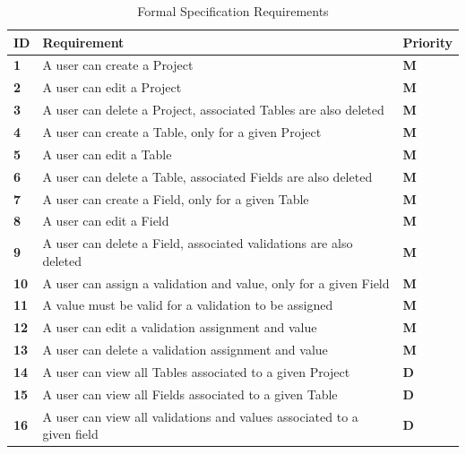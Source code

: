 \documentclass[a4paper,12pt]{article}
\begin{document}
\begin{table}
\centering
\caption{Formal Specification Requirements}
\label{my-label}
\begin{tabular}{|l|l|l|}
\hline
\textbf{ID} & \textbf{Requirement}                                                   & \textbf{Priority} \\ \hline
\textbf{1}  & A user can create a Project                                            & \textbf{M}        \\ \hline
\textbf{2}  & A user can edit a Project                                              & \textbf{M}        \\ \hline
\textbf{3}  & A user can delete a Project, associated Tables are also deleted        & \textbf{M}        \\ \hline
\textbf{4}  & A user can create a Table, only for a given  Project                   & \textbf{M}        \\ \hline
\textbf{5}  & A user can edit a Table                                                & \textbf{M}        \\ \hline
\textbf{6}  & A user can delete a Table, associated Fields are also deleted          & \textbf{M}        \\ \hline
\textbf{7}  & A user can create a Field, only for a given Table                      & \textbf{M}        \\ \hline
\textbf{8}  & A user can edit a Field                                                & \textbf{M}        \\ \hline
\textbf{9}  & A user can delete a Field, associated validations are also deleted     & \textbf{M}        \\ \hline
\textbf{10} & A user can assign a validation and value, only for a given Field       & \textbf{M}        \\ \hline
\textbf{11} & A value must be valid for a validation to be assigned                  & \textbf{M}        \\ \hline
\textbf{12} & A user can edit a validation assignment and value                      & \textbf{M}        \\ \hline
\textbf{13} & A user can delete a validation assignment and value                    & \textbf{M}        \\ \hline
\textbf{14} & A user can view all Tables associated to a given Project               & \textbf{D}        \\ \hline
\textbf{15} & A user can view all Fields associated to a given Table                 & \textbf{D}        \\ \hline
\textbf{16} & A user can view all validations and values associated to a given field & \textbf{D}        \\ \hline
\end{tabular}
\end{table}
\end{document}
